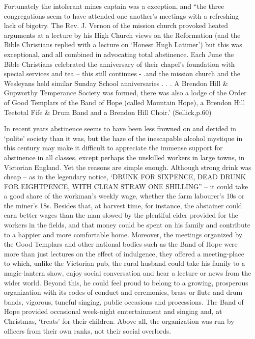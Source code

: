 \documentclass[11pt]{book}
\begin{document}
Fortunately the intolerant mines captain was a exception, and “the three congregations seem to have attended one another’s meetings with a refreshing lack of bigotry. The Rev. J.     Vernon of the mission church provoked heated arguments at a lecture by his High Church views on the Reformation (and the Bible Christians replied with a lecture on ‘Honest Hugh Latimer’) but this was exceptional, and all combined in advocating total abstinence. Each June the Bible Christians celebrated the anniversary of their chapel’s foundation with special services and tea – this still continues - .and the mission church and the Wesleyans held similar Sunday School anniversaries . . .   A Brendon Hill \& Gupworthy Temperance Society  was formed, there was also a lodge of the Order of Good Templars of the Band of Hope (called Mountain Hope), a Brendon Hill Teetotal Fife \& Drum Band and a Brendon Hill Choir.’ (Sellick,p.60)

In recent years abstinence seems to have been less frowned on and derided in ‘polite’ society than it was, but the haze of the inescapable alcohol mystique in this century may make it difficult to appreciate the immense support for abstinence in all classes, except perhaps the unskilled workers in large towns, in Victorian England. Yet the reasons are simple enough. Although strong drink was cheap – as in the legendary notice, ‘DRUNK FOR SIXPENCE, DEAD DRUNK FOR EIGHTPENCE, WITH CLEAN STRAW ONE SHILLING” – it could take a good share of the workman’s weekly wage, whether the farm labourer’s 10s or the miner’s 18s. Besides that, at harvest time,  for instance, the abstainer  could earn better wages than the man slowed by the plentiful  cider provided for the workers in the fields, and that money could be spent on his family and contribute to a happier and more comfortable home. Moreover, the meetings organized by the Good Templars and other national bodies such as the Band of Hope were more than just lectures on the effect of indulgence, they offered a meeting-place to which, unlike the Victorian pub, the rural husband could take his family to a magic-lantern show, enjoy social conversation and hear a lecture or news from the wider world. Beyond this, he could feel proud to belong to a growing, prosperous organization with its codes of conduct and ceremonies, brass or flute and drum bands, vigorous, tuneful singing, public occasions and processions. The Band of Hope provided occasional week-night emtertainment and singing and, at Christmas, ‘treats’ for their children.  Above all, the organization was run by officers from their own ranks, not their social overlords. 
\end{document}
